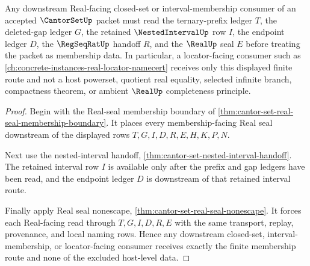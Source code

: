\begin{theorem}
\label{thm:cantor-set-downstream-membership-consumer}
Any downstream Real-facing closed-set or interval-membership consumer of an accepted $\CantorSetUp$ packet must read the ternary-prefix ledger $T$, the deleted-gap ledger $G$, the retained $\NestedIntervalUp$ row $I$, the endpoint ledger $D$, the $\RegSeqRatUp$ handoff $R$, and the $\RealUp$ seal $E$ before treating the packet as membership data. In particular, a locator-facing consumer such as \autoref{ch:concrete-instances-real-locator-namecert} receives only this displayed finite route and not a host powerset, quotient real equality, selected infinite branch, compactness theorem, or ambient $\RealUp$ completeness principle.
\end{theorem}
\begin{proof}
Begin with the Real-seal membership boundary of \autoref{thm:cantor-set-real-seal-membership-boundary}. It places every membership-facing Real seal downstream of the displayed rows $T,G,I,D,R,E,H,K,P,N$.

Next use the nested-interval handoff, \autoref{thm:cantor-set-nested-interval-handoff}. The retained interval row $I$ is available only after the prefix and gap ledgers have been read, and the endpoint ledger $D$ is downstream of that retained interval route.

Finally apply Real seal nonescape, \autoref{thm:cantor-set-real-seal-nonescape}. It forces each Real-facing read through $T,G,I,D,R,E$ with the same transport, replay, provenance, and local naming rows. Hence any downstream closed-set, interval-membership, or locator-facing consumer receives exactly the finite membership route and none of the excluded host-level data.
\end{proof}

